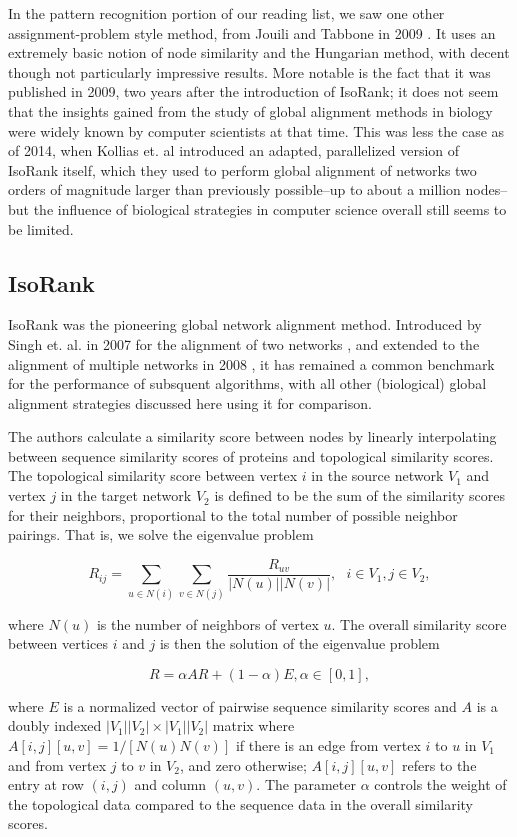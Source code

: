 \documentclass[12pt]{thesis}
\theoremstyle{plain}
\theoremstyle{definition}
\theoremstyle{remark}
\begin{document}
In the pattern recognition portion of our reading list, we saw one other assignment-problem style method, from Jouili and Tabbone in 2009 \cite{Jouili_2009}. It uses an extremely basic notion of node similarity and the Hungarian method, with decent though not particularly impressive results. More notable is the fact that it was published in 2009, two years after the introduction of IsoRank; it does not seem that the insights gained from the study of global alignment methods in biology were widely known by computer scientists at that time. This was less the case as of 2014, when Kollias et. al \cite{Kollias_2014} introduced an adapted, parallelized version of IsoRank itself, which they used to perform global alignment of networks two orders of magnitude larger than previously possible--up to about a million nodes--but the influence of biological strategies in computer science overall still seems to be limited.

\subsection{IsoRank}

IsoRank was the pioneering global network alignment method. Introduced by Singh et. al. in 2007 for the alignment of two networks \cite{Singh_2007}, and extended to the alignment of multiple networks in 2008 \cite{Singh_2008}, it has remained a common benchmark for the performance of subsquent algorithms, with all other (biological) global alignment strategies discussed here using it for comparison. 

The authors calculate a similarity score between nodes by linearly interpolating between sequence similarity scores of proteins and topological similarity scores. The topological similarity score between vertex $i$ in the source network $V_1$ and vertex $j$ in the target network $V_2$ is defined to be the sum of the similarity scores for their neighbors, proportional to the total number of possible neighbor pairings. That is, we solve the eigenvalue problem 

\[R_{ij} = \sum_{u\in N(i)} \sum_{v\in N(j)} \frac{R_{uv}}{|N(u)||N(v)|}, \text{    } i\in V_1, j\in V_2, \]

where $N(u)$ is the number of neighbors of vertex $u$. The overall similarity score between vertices $i$ and $j$ is then the solution of the eigenvalue problem 

\[R = \alpha AR + (1-\alpha) E, \alpha \in [0,1], \]

where $E$ is a normalized vector of pairwise sequence similarity scores and $A$ is a doubly indexed $|V_1||V_2|\times |V_1||V_2|$ matrix where $A[i,j][u,v] = 1/[N(u)N(v)]$ if there is an edge from vertex $i$ to $u$ in $V_1$ and from vertex $j$ to $v$ in $V_2$, and zero otherwise; $A[i,j][u,v]$ refers to the entry at row $(i,j)$ and column $(u,v)$. The parameter $\alpha$ controls the weight of the topological data compared to the sequence data in the overall similarity scores.
\end{document}
